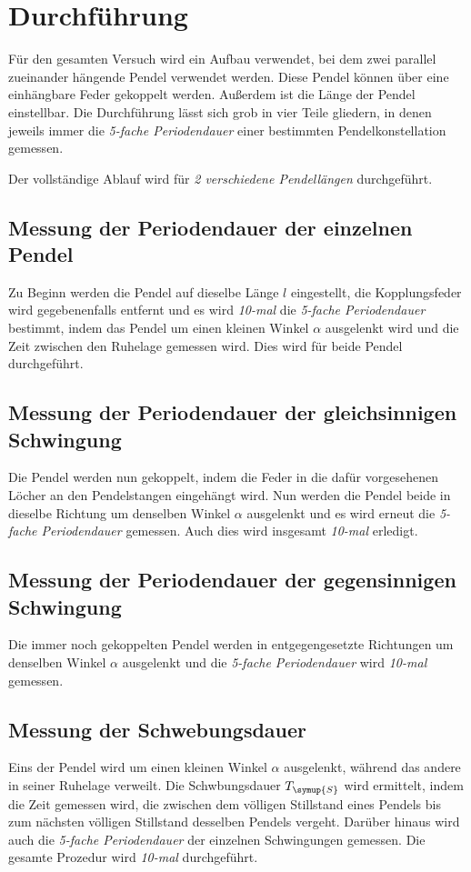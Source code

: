 \section{Durchführung}
\label{sec:Durchführung}
Für den gesamten Versuch wird ein Aufbau verwendet, bei dem zwei parallel zueinander hängende Pendel verwendet werden. Diese Pendel können über
eine einhängbare Feder gekoppelt werden. Außerdem ist die Länge der Pendel einstellbar.
Die Durchführung lässt sich grob in vier Teile gliedern, in denen jeweils immer die \textit{5-fache Periodendauer} einer bestimmten Pendelkonstellation
gemessen.

Der vollständige Ablauf wird für \textit{2 verschiedene Pendellängen} durchgeführt.


\subsection{Messung der Periodendauer der einzelnen Pendel}
Zu Beginn werden die Pendel auf dieselbe Länge $l$ eingestellt, die Kopplungsfeder wird gegebenenfalls entfernt und es wird \textit{10-mal} die 
\textit{5-fache Periodendauer} bestimmt, indem das Pendel um einen kleinen Winkel $\alpha$ ausgelenkt wird und die Zeit zwischen den Ruhelage 
gemessen wird. Dies wird für beide Pendel durchgeführt.

\subsection{Messung der Periodendauer der gleichsinnigen Schwingung}
Die Pendel werden nun gekoppelt, indem die Feder in die dafür vorgesehenen Löcher an den Pendelstangen eingehängt wird. Nun werden die Pendel beide 
in dieselbe Richtung um denselben Winkel $\alpha$ ausgelenkt und es wird erneut die \textit{5-fache Periodendauer} gemessen. Auch dies wird 
insgesamt \textit{10-mal} erledigt.

\subsection{Messung der Periodendauer der gegensinnigen Schwingung}
Die immer noch gekoppelten Pendel werden in entgegengesetzte Richtungen um denselben Winkel $\alpha$ ausgelenkt und die \textit{5-fache Periodendauer}
wird \textit{10-mal} gemessen.

\subsection{Messung der Schwebungsdauer}
Eins der Pendel wird um einen kleinen Winkel $\alpha$ ausgelenkt, während das andere in seiner Ruhelage verweilt. Die Schwbungsdauer $T_{\symup{S}}$ wird
ermittelt, indem die Zeit gemessen wird, die zwischen dem völligen Stillstand eines Pendels bis zum nächsten völligen Stillstand desselben Pendels vergeht.
Darüber hinaus wird auch die \textit{5-fache Periodendauer} der einzelnen Schwingungen gemessen. Die gesamte Prozedur wird \textit{10-mal} durchgeführt.